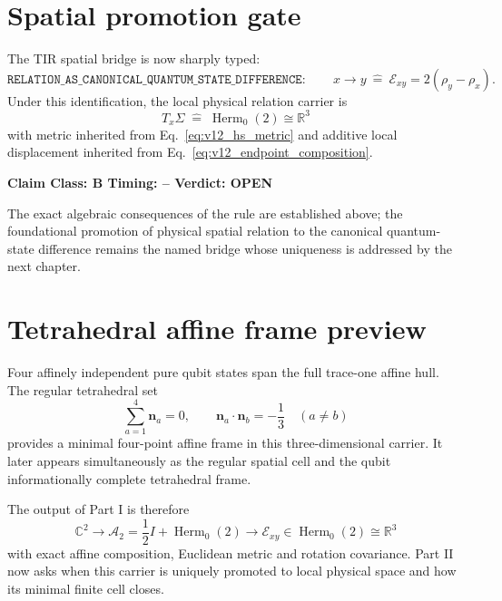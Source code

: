 \documentclass[11pt,a4paper,twoside]{book}
\theoremstyle{definition}
\newcommand{\vTwelveStatus}[3]{\par\noindent\textbf{Claim Class: #1 \quad Timing: #2 \quad Verdict: #3}\par}
\begin{document}
\section{Spatial promotion gate}

The TIR spatial bridge is now sharply typed:
\begin{equation}
\boxed{
\texttt{RELATION\_AS\_CANONICAL\_QUANTUM\_STATE\_DIFFERENCE}:
\qquad
x\to y
\ \widehat{=}\ 
\mathcal E_{xy}=2(\rho_y-\rho_x).
}
\label{eq:v12_relation_promotion_rule}
\end{equation}
Under this identification, the local physical relation carrier is
\begin{equation}
\boxed{
T_x\Sigma\;\widehat{=}\;\operatorname{Herm}_0(2)\cong\mathbb R^3
}
\label{eq:v12_spatial_promotion}
\end{equation}
with metric inherited from Eq.~\eqref{eq:v12_hs_metric} and additive local displacement inherited from Eq.~\eqref{eq:v12_endpoint_composition}.
\vTwelveStatus{B}{--}{OPEN}
The exact algebraic consequences of the rule are established above; the foundational promotion of physical spatial relation to the canonical quantum-state difference remains the named bridge whose uniqueness is addressed by the next chapter.

\section{Tetrahedral affine frame preview}

Four affinely independent pure qubit states span the full trace-one affine hull. The regular tetrahedral set
\begin{equation}
\sum_{a=1}^4\mathbf n_a=0,
\qquad
\mathbf n_a\cdot\mathbf n_b=-\frac13\quad(a\neq b)
\end{equation}
provides a minimal four-point affine frame in this three-dimensional carrier. It later appears simultaneously as the regular spatial cell and the qubit informationally complete tetrahedral frame.

The output of Part I is therefore
\begin{equation}
\boxed{
\mathbb C^2
\to
\mathcal A_2=\frac12I+\operatorname{Herm}_0(2)
\to
\mathcal E_{xy}\in\operatorname{Herm}_0(2)\cong\mathbb R^3
}
\end{equation}
with exact affine composition, Euclidean metric and rotation covariance. Part II now asks when this carrier is uniquely promoted to local physical space and how its minimal finite cell closes.
\end{document}
